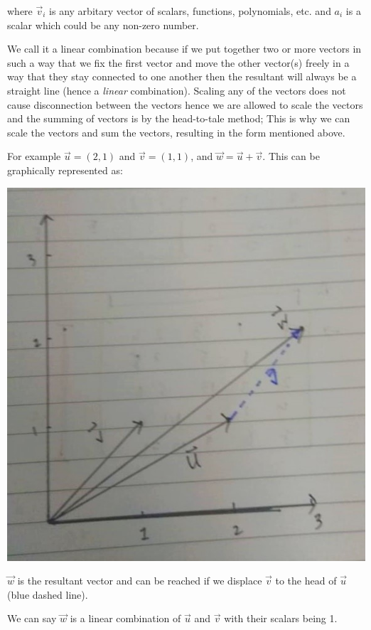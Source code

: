 \documentclass[a4paper, 11pt]{article}
\begin{document}
\begin{enumerate}
where $\vec v_i$ is any arbitary vector of scalars, functions, polynomials, etc. and $a_i$ is a scalar which could be any non-zero number.

We call it a linear combination because if we put together two or more vectors in such a way that we fix the first vector and move the other vector(s) freely
in a way that they stay connected to one another then the resultant will always be a straight line (hence a \textit{linear} combination). Scaling any of the vectors
does not cause disconnection between the vectors hence we are allowed to scale the vectors and the summing of vectors is by the head-to-tale method; This is why we can scale the vectors and sum the vectors, resulting in the form mentioned above.

For example $\vec u = (2, 1)$ and $\vec v = (1, 1)$, and $\vec w = \vec u + \vec v$. This can be graphically represented as: 

\begin{center}
  \includegraphics[width=\linewidth]{images/uvw.jpg}
\end{center}

$\vec w$ is the resultant vector and can be reached if we displace $\vec v$ to the head of $\vec u$ (blue dashed line).

We can say $\vec w$ is a linear combination of $\vec u$ and $\vec v$ with their scalars being 1.


\end{enumerate}
\end{document}
